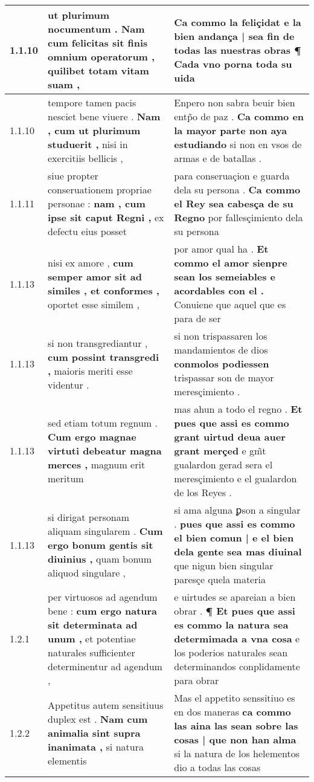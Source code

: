 \begin{tabular}{|p{1cm}|p{6.5cm}|p{6.5cm}|}
1.1.10 & ut plurimum nocumentum . \textbf{ Nam cum felicitas sit finis omnium operatorum , } quilibet totam vitam suam , & Ca commo la feliçidat \textbf{ e la bien andança | sea fin de todas las nuestras obras } ¶ Cada vno porna toda su uida \\\hline
1.1.10 & tempore tamen pacis nesciet bene viuere . \textbf{ Nam , cum ut plurimum studuerit , } nisi in exercitiis bellicis , & Enpero non sabra beuir bien entp̃o de paz . \textbf{ Ca commo en la mayor parte non aya estudiando } si non en vsos de armas e de batallas . \\\hline
1.1.11 & siue propter conseruationem propriae personae : \textbf{ nam , cum ipse sit caput Regni , } ex defectu eius posset & para conseruaçion e guarda dela su persona . \textbf{ Ca commo el Rey sea cabesça de su Regno } por fallesçimiento dela su persona \\\hline
1.1.13 & nisi ex amore , \textbf{ cum semper amor sit ad similes , et conformes , } oportet esse similem , & por amor qual ha . \textbf{ Et commo el amor sienpre sean los semeiables e acordables con el . } Conuiene que aquel que es para de ser \\\hline
1.1.13 & si non transgrediantur , \textbf{ cum possint transgredi , } maioris meriti esse videntur . & si non trispassaren los mandamientos de dios \textbf{ conmolos podiessen } trispassar son de mayor meresçimiento . \\\hline
1.1.13 & sed etiam totum regnum . \textbf{ Cum ergo magnae virtuti debeatur magna merces , } magnum erit meritum & mas ahun a todo el regno . \textbf{ Et pues que assi es commo grant uirtud deua auer grant merçed } e gm̃t gualardon gerad sera el meresçimiento e el gualardon de los Reyes . \\\hline
1.1.13 & si dirigat personam aliquam singularem . \textbf{ Cum ergo bonum gentis sit diuinius , } quam bonum aliquod singulare , & si ama alguna ꝑson a singular . \textbf{ pues que assi es commo el bien comun | e el bien dela gente sea mas diuinal } que nigun bien singular paresçe quela materia \\\hline
1.2.1 & per virtuosos ad agendum bene : \textbf{ cum ergo natura sit determinata ad unum , } et potentiae naturales sufficienter determinentur ad agendum , & e uirtudes se apareian a bien obrar . \textbf{ ¶ Et pues que assi es commo la natura sea determimada a vna cosa } e los poderios naturales sean determinandos conplidamente para obrar \\\hline
1.2.2 & Appetitus autem sensitiuus duplex est . \textbf{ Nam cum animalia sint supra inanimata , } si natura elementis & Mas el appetito senssitiuo es en dos maneras \textbf{ ca commo las aina las sean sobre las cosas | que non han alma } si la natura de los helementos dio a todas las cosas \\\hline

\end{tabular}
